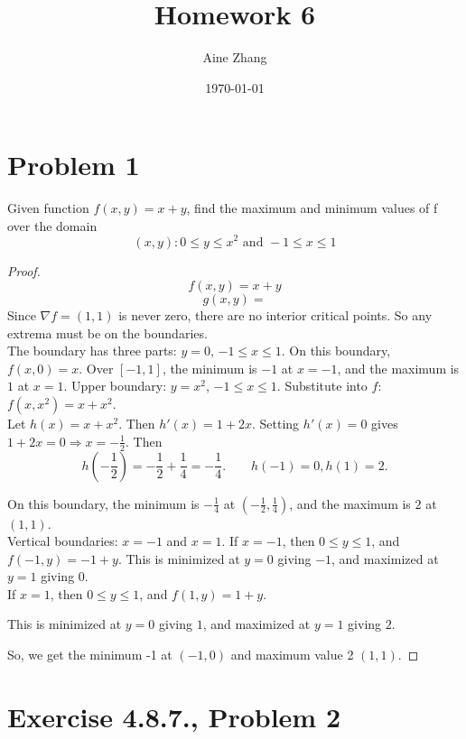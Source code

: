 \documentclass{article}
\title{Homework 6}
\author{Aine Zhang}
\date\today
\begin{document}
\maketitle %

\section*{Problem 1}
Given function $f (x, y) = x + y$, find the maximum and minimum values of f over the domain
$${(x, y): 0 \leq y \leq x^2 \text{ and } - 1 \leq x \leq 1}$$

\begin{proof}
$$f(x,y)= x+y$$
$$g(x,y)=$$
Since $\nabla f = (1,1)$ is never zero, there are no interior critical points. So any extrema must be on the boundaries. \\
The boundary has three parts:
$y=0$, $-1 \le x \le 1$.
On this boundary, $f(x,0)=x$. Over $[-1,1]$, the minimum is $-1$ at $x=-1$, and the maximum is $1$ at $x=1$.
Upper boundary: $y=x^2$, $-1 \le x \le 1$.
Substitute into $f$: $f(x,x^2)=x+x^2.$ \\
Let $h(x)=x+x^2.$ Then $h'(x)=1+2x.$
Setting $h'(x)=0$ gives $1+2x=0  \Rightarrow  x=-\frac12.$
Then
\[
h\!\left(-\frac12\right)
=
-\frac12+\frac14
=
-\frac14. \qquad
h(-1)=0,  h(1)=2.
\]

On this boundary, the minimum is $-\frac14$ at 
$\left(-\frac12,\frac14\right)$, 
and the maximum is $2$ at $(1,1)$. \\
Vertical boundaries: $x=-1$ and $x=1$.
If $x=-1$, then $0 \le y \le 1$, and $f(-1,y)=-1+y.$
This is minimized at $y=0$ giving $-1$, 
and maximized at $y=1$ giving $0$. \\
If $x=1$, then $0 \le y \le 1$, and $f(1,y)=1+y.$

This is minimized at $y=0$ giving $1$, 
and maximized at $y=1$ giving $2$.

So, we get the minimum -1 at $(-1,0)$ and maximum value 2  $(1,1)$.

\end{proof}

\clearpage %

\section*{Exercise 4.8.7., Problem 2}
\end{document}
